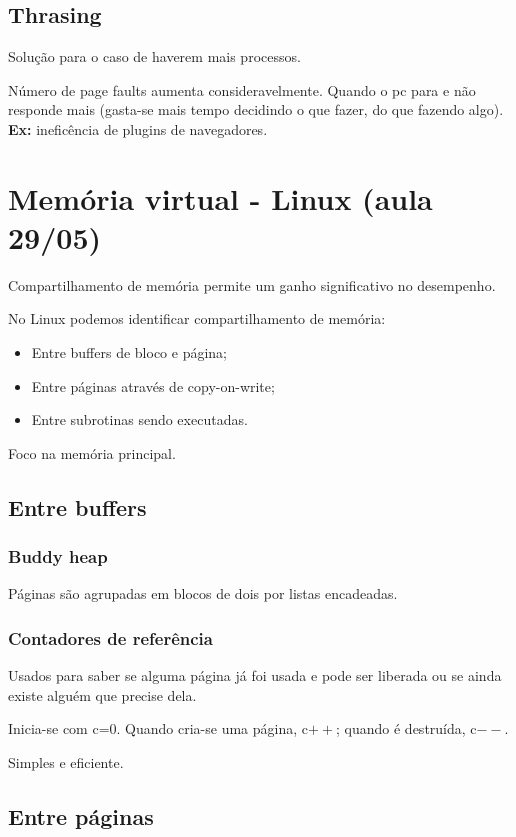 \documentclass[11pt]{article}
\begin{document}
\subsection{Thrasing}
\label{sec:org9517248}
Solução para o caso de haverem mais processos.

Número de page faults aumenta consideravelmente. Quando o pc para e não responde mais
(gasta-se mais tempo decidindo o que fazer, do que fazendo algo). \textbf{Ex:} ineficência de
plugins de navegadores.
\section{Memória virtual - Linux (aula 29/05)}
\label{sec:orgfcc4a05}
Compartilhamento de memória permite um ganho significativo no desempenho.

No Linux podemos identificar compartilhamento de memória:
\begin{itemize}
\item Entre buffers de bloco e página;
\item Entre páginas através de copy-on-write;
\item Entre subrotinas sendo executadas.
\end{itemize}
Foco na memória principal.

\subsection{Entre buffers}
\label{sec:org97e474e}
\subsubsection{Buddy heap}
\label{sec:org6a7b583}
Páginas são agrupadas em blocos de dois por listas encadeadas.
\subsubsection{Contadores de referência}
\label{sec:orga698623}
Usados para saber se alguma página já foi usada e pode ser liberada ou se ainda existe
alguém que precise dela.

Inicia-se com c=0. Quando cria-se uma página, c\(++\); quando é destruída, c\(--\).

Simples e eficiente.

\subsection{Entre páginas}
\label{sec:org1fbc7ff}
\end{document}
